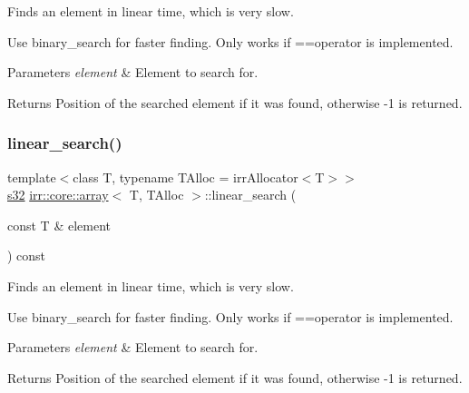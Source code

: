 Finds an element in linear time, which is very slow. 

Use binary\+\_\+search for faster finding. Only works if ==operator is implemented. 
\begin{DoxyParams}{Parameters}
{\em element} & Element to search for. \\
\hline
\end{DoxyParams}
\begin{DoxyReturn}{Returns}
Position of the searched element if it was found, otherwise -\/1 is returned. 
\end{DoxyReturn}
\mbox{\label{classirr_1_1core_1_1array_a4b5002b36bb913a3680f2412ab2ee045}} 
\subsubsection{\texorpdfstring{linear\+\_\+search()}{linear\_search()}\hspace{0.1cm}{\footnotesize\ttfamily [1/2]}}
{\footnotesize\ttfamily template$<$class T, typename T\+Alloc = irr\+Allocator$<$\+T$>$$>$ \\
\hyperlink{namespaceirr_ac66849b7a6ed16e30ebede579f9b47c6}{s32} \hyperlink{classirr_1_1core_1_1array}{irr\+::core\+::array}$<$ T, T\+Alloc $>$\+::linear\+\_\+search (\begin{DoxyParamCaption}\item[{const T \&}]{element }\end{DoxyParamCaption}) const\hspace{0.3cm}{\ttfamily [inline]}}



Finds an element in linear time, which is very slow. 

Use binary\+\_\+search for faster finding. Only works if ==operator is implemented. 
\begin{DoxyParams}{Parameters}
{\em element} & Element to search for. \\
\hline
\end{DoxyParams}
\begin{DoxyReturn}{Returns}
Position of the searched element if it was found, otherwise -\/1 is returned. 
\end{DoxyReturn}
\mbox{\label{classirr_1_1core_1_1array_a4b5002b36bb913a3680f2412ab2ee045}} 
